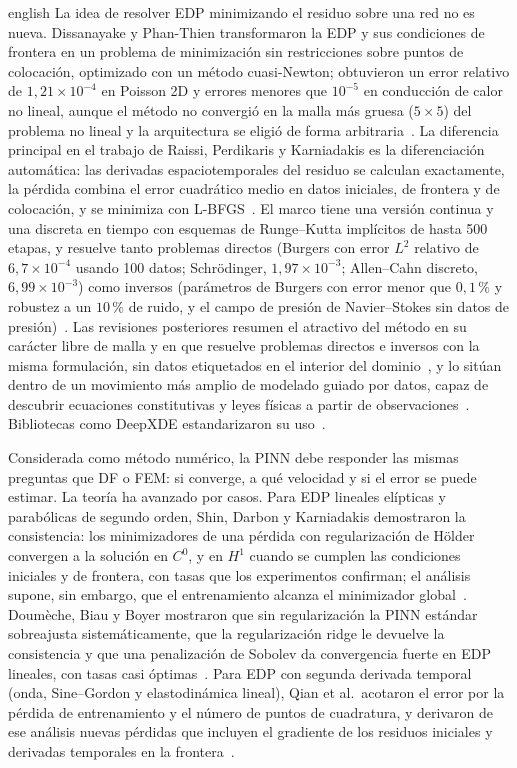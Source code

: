 \documentclass[0000.tex]{subfiles}
\begin{document}
\begin{hyphenrules}{english}
La idea de resolver EDP minimizando el residuo sobre una red no es nueva. Dissanayake y Phan-Thien transformaron la EDP y sus condiciones de frontera en un problema de minimización sin restricciones sobre puntos de colocación, optimizado con un método cuasi-Newton; obtuvieron un error relativo de $1{,}21\times10^{-4}$ en Poisson 2D y errores menores que $10^{-5}$ en conducción de calor no lineal, aunque el método no convergió en la malla más gruesa ($5\times5$) del problema no lineal y la arquitectura se eligió de forma arbitraria~\cite{dissanayake1994neural}. La diferencia principal en el trabajo de Raissi, Perdikaris y Karniadakis es la diferenciación automática: las derivadas espaciotemporales del residuo se calculan exactamente, la pérdida combina el error cuadrático medio en datos iniciales, de frontera y de colocación, y se minimiza con L-BFGS~\cite{raissi2017physics,raissi2019physics}. El marco tiene una versión continua y una discreta en tiempo con esquemas de Runge--Kutta implícitos de hasta 500 etapas, y resuelve tanto problemas directos (Burgers con error $L^2$ relativo de $6{,}7\times10^{-4}$ usando 100 datos; Schrödinger, $1{,}97\times10^{-3}$; Allen--Cahn discreto, $6{,}99\times10^{-3}$) como inversos (parámetros de Burgers con error menor que $0{,}1\,\%$ y robustez a un $10\,\%$ de ruido, y el campo de presión de Navier--Stokes sin datos de presión)~\cite{raissi2017physics,raissi2017physicsII,raissi2019physics}. Las revisiones posteriores resumen el atractivo del método en su carácter libre de malla y en que resuelve problemas directos e inversos con la misma formulación, sin datos etiquetados en el interior del dominio~\cite{cuomo2022scientific,luo2025physics}, y lo sitúan dentro de un movimiento más amplio de modelado guiado por datos, capaz de descubrir ecuaciones constitutivas y leyes físicas a partir de observaciones~\cite{montans2019data}. Bibliotecas como DeepXDE estandarizaron su uso~\cite{lu2021deepxde}.

Considerada como método numérico, la PINN debe responder las mismas preguntas que DF o FEM: si converge, a qué velocidad y si el error se puede estimar. La teoría ha avanzado por casos. Para EDP lineales elípticas y parabólicas de segundo orden, Shin, Darbon y Karniadakis demostraron la consistencia: los minimizadores de una pérdida con regularización de Hölder convergen a la solución en $C^0$, y en $H^1$ cuando se cumplen las condiciones iniciales y de frontera, con tasas que los experimentos confirman; el análisis supone, sin embargo, que el entrenamiento alcanza el minimizador global~\cite{shin2020convergence}. Doumèche, Biau y Boyer mostraron que sin regularización la PINN estándar sobreajusta sistemáticamente, que la regularización ridge le devuelve la consistencia y que una penalización de Sobolev da convergencia fuerte en EDP lineales, con tasas casi óptimas~\cite{doumeche2025convergence}. Para EDP con segunda derivada temporal (onda, Sine--Gordon y elastodinámica lineal), Qian et al.\ acotaron el error por la pérdida de entrenamiento y el número de puntos de cuadratura, y derivaron de ese análisis nuevas pérdidas que incluyen el gradiente de los residuos iniciales y derivadas temporales en la frontera~\cite{qian2023error}.


\end{hyphenrules}
\end{document}
